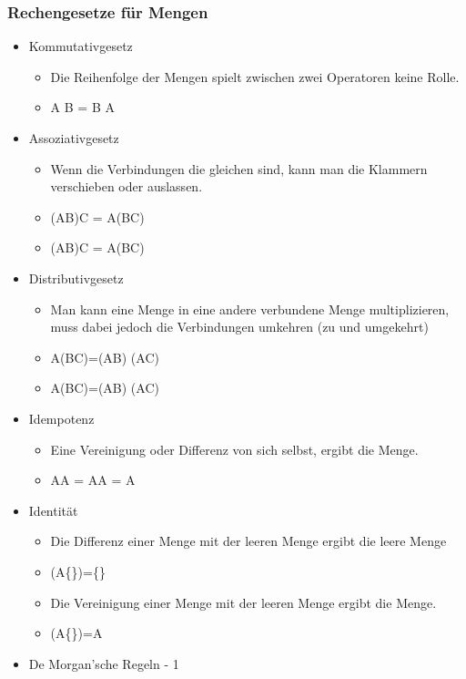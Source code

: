 \documentclass{article}
\begin{document}
	\subsubsection{Rechengesetze für Mengen}
	\begin{itemize}
		\item{Kommutativgesetz}
		\begin{itemize}
			\item{Die Reihenfolge der Mengen spielt zwischen zwei Operatoren keine Rolle.}
			\item{A \cup B = B \cup A}
		\end{itemize}
		\item{Assoziativgesetz}
		\begin{itemize}
			\item{Wenn die Verbindungen die gleichen sind, kann man die Klammern verschieben oder auslassen.}
			\item{(A\cap B)\cap C = A\cap (B\cap C)}
			\item{(A\cup B)\cup C = A\cup (B\cap C)}
		\end{itemize}
		\item{Distributivgesetz}
		\begin{itemize}
			\item{Man kann eine Menge in eine andere verbundene Menge multiplizieren, muss dabei jedoch die Verbindungen umkehren (\cup zu \cap und umgekehrt)}
			\item{A\cup (B\cap C)=(A\cup B) \cap (A\cup C)}
			\item{A\cap (B\cup C)=(A\cap B) \cup (A\cap C)}
		\end{itemize}
		\item{Idempotenz}
		\begin{itemize}
			\item{Eine Vereinigung oder Differenz von sich selbst, ergibt die Menge.}
			\item{A\cap A = A\cup A = A}
		\end{itemize}
		\item{Identität}
		\begin{itemize}
			\item{Die Differenz einer Menge mit der leeren Menge ergibt die leere Menge}
			\item{(A\cap \{\})=\{\}}
			\item{Die Vereinigung einer Menge mit der leeren Menge ergibt die Menge.}
			\item{(A\cup \{\})=A}
		\end{itemize}
		\item{De Morgan'sche Regeln - 1}

\end{itemize}
\end{document}
